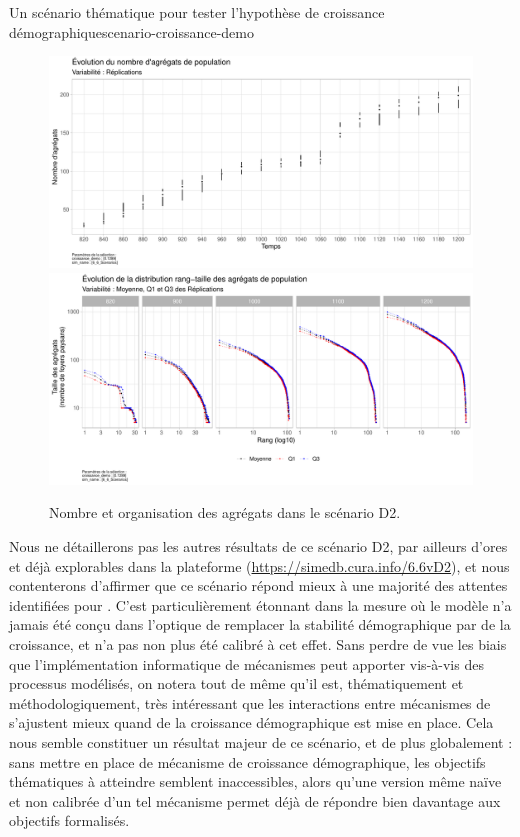 \begin{encadre}{Un scénario thématique pour tester l'hypothèse de croissance démographique}{scenario-croissance-demo}
\begin{figure}[H]
	\centering
	\includegraphics[width=\linewidth]{img/Agregats_Nb_D2.pdf}
	\includegraphics[width=\linewidth]{img/Agregats_RT_D2.pdf}
	\caption{Nombre et organisation des agrégats dans le scénario D2.}
	\label{fig:scenario-D2-agregats}
\end{figure}

Nous ne détaillerons pas les autres résultats de ce scénario D2, par ailleurs d'ores et déjà explorables dans la plateforme \simedb{} (\href{https://simedb.cura.info/6.6vD2}{https://simedb.cura.info/6.6vD2}), et nous contenterons d'affirmer que ce scénario répond mieux à une majorité des attentes identifiées pour \simfeodal{}.
C'est particulièrement étonnant dans la mesure où le modèle n'a jamais été conçu dans l'optique de remplacer la stabilité démographique par de la croissance, et n'a pas non plus été calibré à cet effet.
Sans perdre de vue les biais que l'implémentation informatique de mécanismes peut apporter vis-à-vis des processus modélisés, on notera tout de même qu'il est, thématiquement et méthodologiquement, très intéressant que les interactions entre mécanismes de \simfeodal{} s'ajustent mieux quand de la croissance démographique est mise en place.
Cela nous semble constituer un résultat majeur de ce scénario, et de \simfeodal{} plus globalement : sans mettre en place de mécanisme de croissance démographique, les objectifs thématiques à atteindre semblent inaccessibles, alors qu'une version même naïve et non calibrée d'un tel mécanisme permet déjà de répondre bien davantage aux objectifs formalisés.


\end{encadre}
